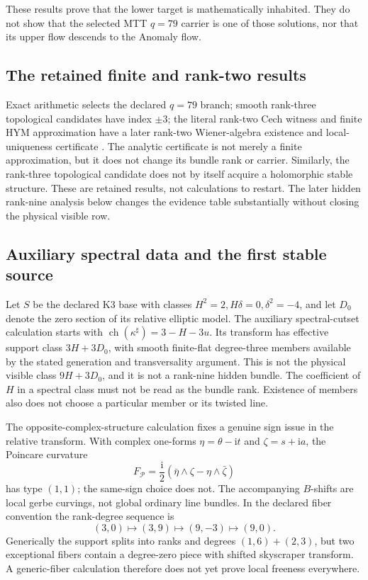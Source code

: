 \documentclass[11pt]{article}
\theoremstyle{definition}
\theoremstyle{remark}
\newcommand{\ii}{\mathrm i}
\begin{document}
These results prove that the lower target is mathematically inhabited.  They
do not show that the selected MTT \(q=79\) carrier is one of those solutions,
nor that its upper flow descends to the Anomaly flow.

\subsection{The retained finite and rank-two results}
\label{sec:retained-q79}

Exact arithmetic selects the declared \(q=79\) branch; smooth rank-three
topological candidates have index \(\pm3\); the literal rank-two Cech
witness and finite HYM approximation have a later rank-two Wiener-algebra
existence and local-uniqueness certificate \cite{MTTResultsRepro}.
The analytic certificate is not merely a finite approximation, but it does
not change its bundle rank or carrier.  Similarly, the rank-three topological
candidate does not by itself acquire a holomorphic stable structure.  These
are retained results, not calculations to restart.  The later hidden
rank-nine analysis below changes the evidence table substantially without
closing the physical visible row.

\subsection{Auxiliary spectral data and the first stable source}
\label{sec:aux-spectral}

Let \(S\) be the declared K3 base with classes
\(H^2=2,H\delta=0,\delta^2=-4\), and let \(D_0\) denote the zero section
of its relative elliptic model.  The auxiliary spectral-cutset calculation
\cite{FRSpectral} starts with
\(\operatorname{ch}(\kappa^\sharp)=3-H-3u\).  Its transform has effective
support class \(3H+3D_0\), with smooth finite-flat degree-three members
available by the stated generation and transversality argument.  This is
not the physical visible class \(9H+3D_0\), and it is not a rank-nine hidden
bundle.  The coefficient of \(H\) in a spectral class must not be read as
the bundle rank.  Existence of members also does not choose a particular
member or its twisted line.

The opposite-complex-structure calculation \cite{FRG3E} fixes a genuine sign
issue in the relative transform.  With complex one-forms
\(\eta=\theta-\ii t\) and \(\zeta=s+\ii a\), the Poincare curvature
\[
F_{\mathcal P}=\frac{\ii}{2}
(\bar\eta\wedge\zeta-\eta\wedge\bar\zeta)
\]
has type \((1,1)\); the same-sign choice does not.  The accompanying
\(B\)-shifts are local gerbe curvings, not global ordinary line bundles.
In the declared fiber convention the rank-degree sequence is
\[
(3,0)\longmapsto(3,9)\longmapsto(9,-3)\longmapsto(9,0).
\]
Generically the support splits into ranks and degrees \((1,6)+(2,3)\),
but two exceptional fibers contain a degree-zero piece with shifted
skyscraper transform.  A generic-fiber calculation therefore does not yet
prove local freeness everywhere.
\end{document}
